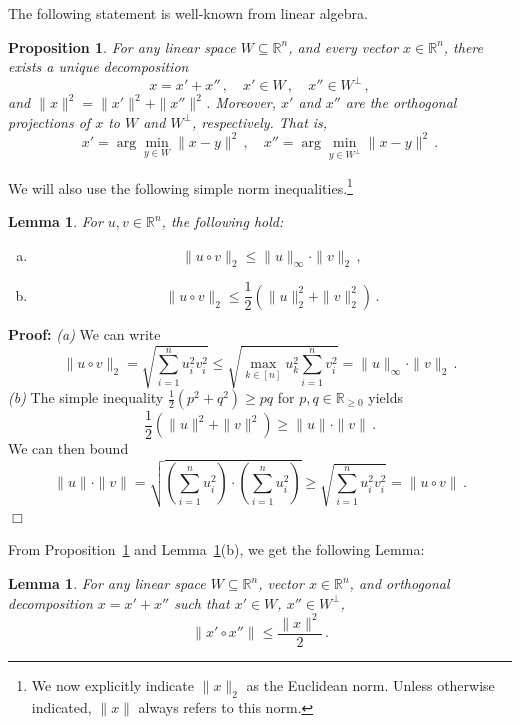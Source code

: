 \documentclass[12pt, showidx, twoside]{article}
\newtheorem{proposition}[satz]{Proposition}
\newtheorem{lemma}[satz]{Lemma}
\def\prove{\par \noindent \hbox{\bf Proof:}\quad}
\def\endproof{\hfill{$\Box$}}
\def\R{\mathbb{R}}
\def\Rp{\mathbb{R}_{\ge0}}
\begin{document}
{{{The following statement is well-known from linear algebra.
\begin{proposition}\label{prop:orth-decomp}
For any linear space $W\subseteq\R^n$, and every vector $x\in\R^n$, there exists a \emph{unique decomposition}
\[
    x=x'+x''\, ,\quad x'\in W\, ,\quad x''\in W^\perp\, ,
\]
and $\|x\|^2=\|x'\|^2+\|x''\|^2$. Moreover, $x'$ and $x''$ are the orthogonal projections of $x$ to $W$ and $W^\perp$, respectively. That is,
\[
    x'=\arg\min_{y\in W} \|x-y\|^2\, ,\quad     x''=\arg\min_{y\in W^\perp} \|x-y\|^2\, .
\]
\end{proposition}

We will also use the following simple norm inequalities.\footnote{We now explicitly indicate $\|x\|_2$ as the Euclidean norm. Unless otherwise indicated, $\|x\|$ always refers to this norm.}
\begin{lemma}\label{lem:uv}
For $u,v\in\R^n$, the following hold:
\begin{enumerate}[(a)]
\item 
\[
     \|u\circ v\|_2\le\|u\|_\infty\cdot \|v\|_2\, ,
\]
\item 
\[
    \|u\circ v\|_2\le\frac{1}{2}\left(\|u\|_2^2+\|v\|_2^2\right)\, .
\]
\end{enumerate}
\end{lemma}
\prove
{\em (a)}
We can write
\[
     \|u\circ v\|_2=\sqrt{\sum_{i=1}^n u_i^2 v_i^2}\le
     \sqrt{\max_{k\in [n]}u_k^2 \sum_{i=1}^n v_i^2}=\|u\|_\infty \cdot \|v\|_2\, .
\]
{\em (b)}
The simple inequality $\frac{1}{2}(p^2+q^2)\ge pq$ for $p,q\in \Rp$ yields
\[
    \frac{1}{2}\left(\|u\|^2+\|v\|^2\right)\ge \|u\|\cdot\|v\|\, .
\]
We can then bound
\[
   \|u\|\cdot\|v\|=\sqrt{\left(\sum_{i=1}^n  u_i^2\right)\cdot \left(\sum_{i=1}^n  u_i^2\right)}\ge
   \sqrt{\sum_{i=1}^n  u_i^2v_i^2}=\|u\circ v\|\, .
\]
\endproof

From Proposition~\ref{prop:orth-decomp} and Lemma~\ref{lem:uv}(b), we get the following Lemma:
\begin{lemma}\label{lem:orth-decomp-norm}
For any linear space $W\subseteq\R^n$,  vector $x\in\R^n$, and orthogonal decomposition $x=x'+x''$ such that $x'\in W$, $x''\in W^\perp$,
\[
    \|x'\circ x''\|\le \frac{\|x\|^2}{2}\, .
\]
\end{lemma}


}}}
\end{document}
